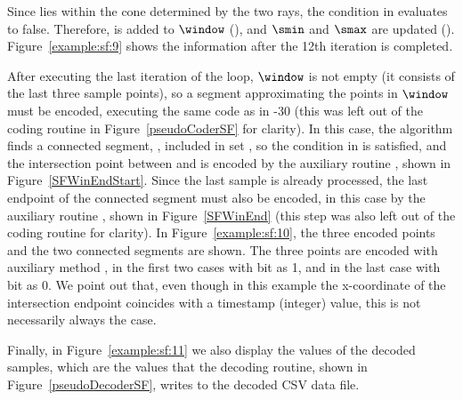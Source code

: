 \clearpage


Since  lies within the cone determined by the two rays, the condition in  evaluates to false. Therefore,  is added to $\window$ (), and $\smin$ and $\smax$ are updated (). Figure~\ref{example:sf:9}  shows the information after the 12th iteration is completed.




After executing the last iteration of the loop, $\window$ is not empty (it consists of the last three sample points), so a segment approximating the points in $\window$ must be encoded, executing the same code as in -30 (this was left out of the coding routine in Figure~\ref{pseudoCoderSF} for clarity). In this case, the algorithm finds a connected segment, \segmentConnT, included in set \segmentSet, so the condition in  is satisfied, and the intersection point between \segmentLastT and \segmentConnT is encoded by the auxiliary routine \SFEncodeWinEndStart, shown in Figure~\ref{SFWinEndStart}. Since the last sample is already processed, the last endpoint of the connected segment must also be encoded, in this case by the auxiliary routine \SFWinEndP, shown in Figure~\ref{SFWinEnd} (this step was also left out of the coding routine for clarity). In Figure~\ref{example:sf:10}, the three encoded points and the two connected segments are shown. The three points are encoded with auxiliary method \SFEncodePoint, in the first two cases with bit \connectedS as 1, and in the last case with bit \connectedS as 0. We point out that, even though in this example the x-coordinate of the intersection endpoint coincides with a timestamp (integer) value, this is not necessarily always the case.


\vspace{+5pt}


\clearpage


Finally, in Figure~\ref{example:sf:11} we also display the values of the decoded samples, which are the values that the decoding routine, shown in Figure~\ref{pseudoDecoderSF}, writes to the decoded CSV data file.


\vspace{+5pt}

